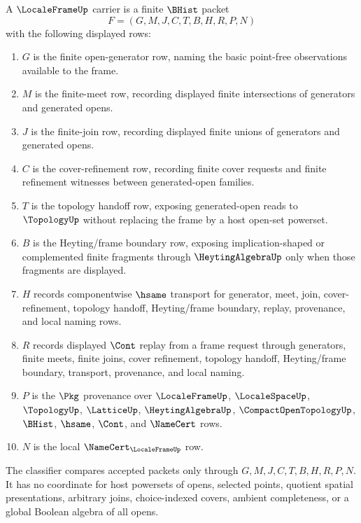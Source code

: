 \begin{definition}
\label{def:locale-frame-carrier}
A $\LocaleFrameUp$ carrier is a finite $\BHist$ packet
$$
F=(G,M,J,C,T,B,H,R,P,N)
$$
with the following displayed rows:
\begin{enumerate}
\item $G$ is the finite open-generator row, naming the basic point-free observations available to the frame.
\item $M$ is the finite-meet row, recording displayed finite intersections of generators and generated opens.
\item $J$ is the finite-join row, recording displayed finite unions of generators and generated opens.
\item $C$ is the cover-refinement row, recording finite cover requests and finite refinement witnesses between generated-open families.
\item $T$ is the topology handoff row, exposing generated-open reads to $\TopologyUp$ without replacing the frame by a host open-set powerset.
\item $B$ is the Heyting/frame boundary row, exposing implication-shaped or complemented finite fragments through $\HeytingAlgebraUp$ only when those fragments are displayed.
\item $H$ records componentwise $\hsame$ transport for generator, meet, join, cover-refinement, topology handoff, Heyting/frame boundary, replay, provenance, and local naming rows.
\item $R$ records displayed $\Cont$ replay from a frame request through generators, finite meets, finite joins, cover refinement, topology handoff, Heyting/frame boundary, transport, provenance, and local naming.
\item $P$ is the $\Pkg$ provenance over $\LocaleFrameUp$, $\LocaleSpaceUp$, $\TopologyUp$, $\LatticeUp$, $\HeytingAlgebraUp$, $\CompactOpenTopologyUp$, $\BHist$, $\hsame$, $\Cont$, and $\NameCert$ rows.
\item $N$ is the local $\NameCert_{\LocaleFrameUp}$ row.
\end{enumerate}
The classifier compares accepted packets only through $G,M,J,C,T,B,H,R,P,N$. It has no coordinate for host powersets of opens, selected points, quotient spatial presentations, arbitrary joins, choice-indexed covers, ambient completeness, or a global Boolean algebra of all opens.
\end{definition}

